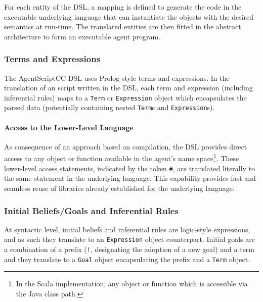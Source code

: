 For each entity of the DSL, a mapping is defined to generate the code in the executable underlying language that can instantiate the objects with the desired semantics at run-time. The translated entities are then fitted in the abstract architecture to form an executable agent program.

\subsubsection{Terms and Expressions}
The AgentScriptCC DSL uses Prolog-style terms and expressions. In the translation of an script written in the DSL, each term and expression (including inferential rules) maps to a \verb+Term+ or \verb+Expression+ object which encapsulates the parsed data (potentially containing nested \verb+Term+s and \verb+Expression+s).

\paragraph{Access to the Lower-Level Language} As consequence of an approach based on compilation, the DSL provides direct access to any object or function available in the agent's name space\footnote{In the Scala implementation, any object or function which is accessible via the Java class path.}. These lower-level access statements, indicated by the token \verb+#+, are translated literally to the same statement in the underlying language. This capability provides fast and seamless reuse of libraries already established for the underlying language.


\subsubsection{Initial Beliefs/Goals and Inferential Rules}
At syntactic level, initial beliefs and inferential rules are logic-style expressions, and as such they translate to an \verb+Expression+ object counterpart. Initial goals are a combination of a prefix (\verb+!+, designating the adoption of a new goal)
and a term and they translate to a \verb+Goal+ object encapsulating the prefix and a \verb+Term+ object.

